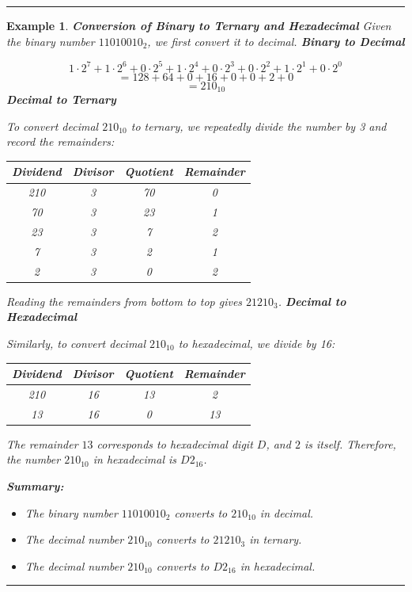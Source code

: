 \documentclass[12pt]{article}
\newtheorem{example}{Example}
\newenvironment{examp}
{\vspace{0.5cm}
\hrule
\begin{example}}
{\hrule
\vspace{0.5cm}
\end{example}}
\begin{document}
\begin{examp}
	\textbf{Conversion of Binary to Ternary and Hexadecimal}\newline
	Given the binary number \( 11010010_2 \), we first convert it to decimal.
	\newline
	\textbf{Binary to Decimal}

	\[
		1 \cdot 2^7 + 1 \cdot 2^6 + 0 \cdot 2^5 + 1 \cdot 2^4 + 0 \cdot 2^3 + 0 \cdot 2^2 + 1 \cdot 2^1 + 0 \cdot 2^0 \]
	\[= 128 + 64 + 0 + 16 + 0 + 0 + 2 + 0\]
	\[= 210_{10}\]
	\newline
	\textbf{Decimal to Ternary}

	To convert decimal \(210_{10}\) to ternary, we repeatedly divide the number by 3 and record the remainders:

	\begin{center}
		\begin{tabular}{cccc}
			Dividend & Divisor & Quotient & Remainder \\
			\hline
			210      & 3       & 70       & 0         \\
			70       & 3       & 23       & 1         \\
			23       & 3       & 7        & 2         \\
			7        & 3       & 2        & 1         \\
			2        & 3       & 0        & 2         \\
		\end{tabular}
	\end{center}

	Reading the remainders from bottom to top gives \(21210_3\).
	\vspace{3mm}
	\newline
	\textbf{Decimal to Hexadecimal}

	Similarly, to convert decimal \(210_{10}\) to hexadecimal, we divide by 16:
	\begin{center}
		\begin{tabular}{cccc}
			Dividend & Divisor & Quotient & Remainder \\
			\hline
			210      & 16      & 13       & 2         \\
			13       & 16      & 0        & 13        \\
		\end{tabular}
	\end{center}

	The remainder \(13\) corresponds to hexadecimal digit \(D\), and \(2\) is itself. Therefore, the number \(210_{10}\) in hexadecimal is \(D2_{16}\).

	\textbf{Summary:}
	\begin{itemize}
		\item The binary number \(11010010_2\) converts to \(210_{10}\) in decimal.
		\item The decimal number \(210_{10}\) converts to \(21210_3\) in ternary.
		\item The decimal number \(210_{10}\) converts to \(D2_{16}\) in hexadecimal.
	\end{itemize}


\end{examp}
\end{document}
